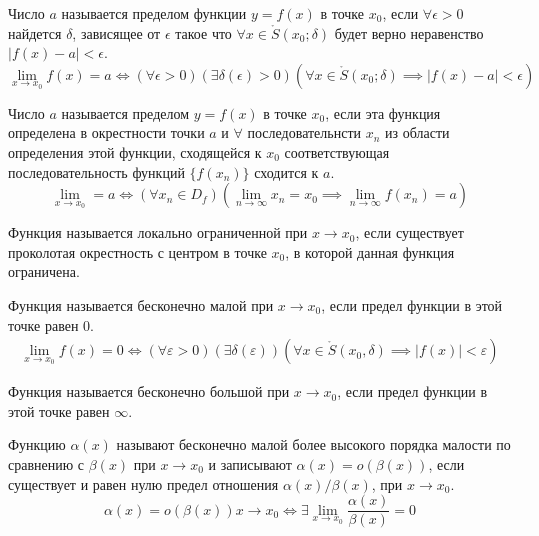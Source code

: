 \begin{definition} \label{def:28}
    Число $a$ называется пределом функции $y = f\left( x \right) $ в точке $x_0$, если $\forall \epsilon > 0$ найдется $\delta$, зависящее от  $\epsilon$ такое что $\forall x \in \mathring{S}(x_0; \delta)$ будет верно неравенство $|f\left( x \right) - a| < \epsilon$.
    \[
        \lim_{x \to x_0} f(x) = a \iff (\forall \epsilon > 0)(\exists  \delta(\epsilon) > 0)(\forall  x \in \mathring{S}(x_0; \delta) \implies |f(x) - a| < \epsilon)
    \]
\end{definition}

\begin{definition} \label{def:29}
    Число $a$ называется пределом $y = f\left( x \right) $ в точке $x_0$, если эта функция определена в окрестности точки $a$ и $\forall$ последовательнсти $x_{n}$ из области определения этой функции, сходящейся к $x_0$ соответствующая последовательность функций $\{f(x_{n})\}$ сходится к $a$. \[
        \lim_{x \to x_0} = a \iff (\forall x_{n}\in D_f)(\lim_{n \to \infty} x_{n} = x_0 \implies \lim_{n \to \infty} f(x_{n}) = a) 
    \] 
\end{definition}

\begin{definition} \label{def:34}
    Функция называется локально ограниченной при $x \to x_0$, если существует проколотая окрестность с центром в точке $x_0$, в которой данная функция ограничена.
\end{definition}

\begin{definition} \label{def:35}
    Функция называется бесконечно малой при $x \to x_0$, если предел функции в этой точке равен $0$.
    \begin{gather*}
        \lim_{x \to x_0} f(x) = 0 \iff (\forall \varepsilon > 0)(\exists \delta(\varepsilon)) (\forall x \in \mathring{S}(x_0, \delta) \implies |f(x)| < \varepsilon )
    \end{gather*}
\end{definition}

\begin{definition} \label{def:36}
    Функция называется бесконечно большой при $x \to x_0$, если предел функции в этой точке равен $\infty$.
\end{definition}

\begin{definition} \label{def:42}
    Функцию $\alpha(x)$ называют бесконечно малой более высокого порядка малости по сравнению с $\beta(x)$ при $x \to x_0$ и записывают $\alpha(x) = o(\beta(x))$, если существует и равен нулю предел отношения $\alpha(x)/\beta(x)$, при $x \to x_0$. \[
        \alpha(x) = o(\beta(x)) x \to x_0 \iff \exists \lim_{x \to x_0} \frac{\alpha(x)}{\beta(x)} = 0
    \]
\end{definition}

